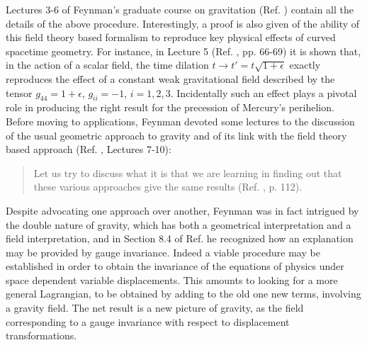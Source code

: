 \documentclass{ws-procs961x669}            %
\begin{document}
Lectures 3-6 of Feynman's graduate course on gravitation (Ref.
) contain all the details of the above
procedure. Interestingly, a proof is also given of the ability of
this field theory based formalism to reproduce key physical
effects of curved spacetime geometry. For instance, in Lecture 5
(Ref. , pp. 66-69) it is shown that, in
the action of a scalar field, the time dilation $t\rightarrow
t'=t\sqrt{1+\epsilon}$ exactly reproduces the effect of a constant
weak gravitational field described by the tensor
$g_{44}=1+\epsilon$, $g_{ii}=-1$, $i=1,2,3$. Incidentally such an
effect plays a pivotal role in producing the right result for the
precession of Mercury's perihelion. Before moving to applications,
Feynman devoted some lectures to the discussion of the usual
geometric approach to gravity and of its link with the field
theory based approach (Ref. , Lectures
7-10):
%
\begin{quote}
Let us try to discuss what it is that we are learning in finding
out that these various approaches give the same results (Ref.
, p. 112).
\end{quote}
%
Despite advocating one approach over another, Feynman was in fact
intrigued by the double nature of gravity, which has both a
geometrical interpretation and a field interpretation, and in
Section 8.4 of Ref.  he recognized how an
explanation may be provided by gauge invariance. Indeed a viable
procedure may be established in order to obtain the invariance of
the equations of physics under space dependent variable
displacements. This amounts to looking for a more general
Lagrangian, to be obtained by adding to the old one new terms,
involving a gravity field. The net result is a new picture of
gravity, as the field corresponding to a gauge invariance with
respect to displacement transformations.
\end{document}
